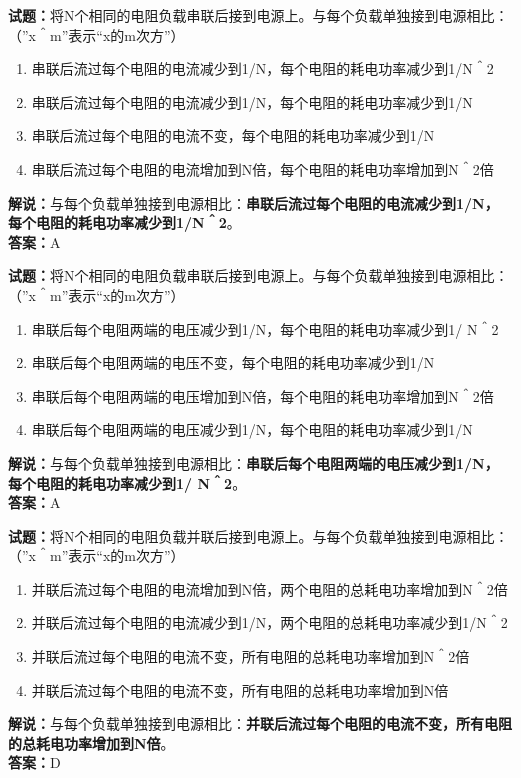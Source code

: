\documentclass{ctexbook}
\begin{document}
\noindent\textbf{试题：}将N个相同的电阻负载串联后接到电源上。与每个负载单独接到电源相比：（”x＾m”表示“x的m次方”）
\begin{enumerate}[leftmargin=3em]
\item 串联后流过每个电阻的电流减少到1/N，每个电阻的耗电功率减少到1/N＾2
\item 串联后流过每个电阻的电流减少到1/N，每个电阻的耗电功率减少到1/N
\item 串联后流过每个电阻的电流不变，每个电阻的耗电功率减少到1/N
\item 串联后流过每个电阻的电流增加到N倍，每个电阻的耗电功率增加到N＾2倍
\end{enumerate}
\noindent\textbf{解说：}与每个负载单独接到电源相比：\textbf{串联后流过每个电阻的电流减少到1/N，每个电阻的耗电功率减少到1/N＾2}。\\\noindent\textbf{答案：}A




\bigskip


\noindent\textbf{试题：}将N个相同的电阻负载串联后接到电源上。与每个负载单独接到电源相比：（”x＾m”表示“x的m次方”）
\begin{enumerate}[leftmargin=3em]
\item 串联后每个电阻两端的电压减少到1/N，每个电阻的耗电功率减少到1/ N＾2
\item 串联后每个电阻两端的电压不变，每个电阻的耗电功率减少到1/N
\item 串联后每个电阻两端的电压增加到N倍，每个电阻的耗电功率增加到N＾2倍
\item 串联后每个电阻两端的电压减少到1/N，每个电阻的耗电功率减少到1/N
\end{enumerate}
\noindent\textbf{解说：}与每个负载单独接到电源相比：\textbf{串联后每个电阻两端的电压减少到1/N，每个电阻的耗电功率减少到1/ N＾2}。\\\noindent\textbf{答案：}A




\bigskip


\noindent\textbf{试题：}将N个相同的电阻负载并联后接到电源上。与每个负载单独接到电源相比：（”x＾m”表示“x的m次方”）
\begin{enumerate}[leftmargin=3em]
\item 并联后流过每个电阻的电流增加到N倍，两个电阻的总耗电功率增加到N＾2倍
\item 并联后流过每个电阻的电流减少到1/N，两个电阻的总耗电功率减少到1/N＾2
\item 并联后流过每个电阻的电流不变，所有电阻的总耗电功率增加到N＾2倍
\item 并联后流过每个电阻的电流不变，所有电阻的总耗电功率增加到N倍
\end{enumerate}
\noindent\textbf{解说：}与每个负载单独接到电源相比：\textbf{并联后流过每个电阻的电流不变，所有电阻的总耗电功率增加到N倍}。\\\noindent\textbf{答案：}D
\end{document}
